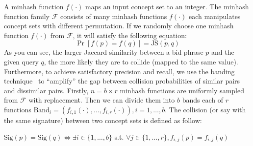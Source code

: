 A minhash function $f(\cdot)$ maps an input concept set to an integer.  The minhash function family
$\mathcal{F}$ consists of many minhash functions
$f(\cdot)$ each manipulates concept sets with different permutation. 
If we randomly choose one minhash function $f(\cdot)$ from
$\mathcal{F}$, it will satisfy the following equation:
\begin{equation}
\label{eqn:minhash}
\Pr[f(p)=f(q)]=\text{JS}(p,q)
\end{equation}
As you can see, the larger Jaccard similarity between a bid phrase $p$ and the
given query $q$, the more likely they are to collide (mapped to the same value).
Furthermore, to achieve satisfactory precision and recall, we use the banding
technique~\cite{raja:massivedatasets} to ``amplify'' the gap between 
collision probabilities of similar pairs and dissimilar pairs.
Firstly, $n=b\times{}r$ minhash functions are uniformly sampled from $\mathcal{F}$ with
replacement. 
Then we can divide them into $b$ bands each of $r$ functions 
$\text{Band}_{i}=(f_{i,1}(\cdot),\ldots,f_{i,r}(\cdot)),i=1,\ldots,b$.
The collision (or say with the same signature) 
between two concept sets is defined as follow:
\begin{definition}
\label{def:col}
$\text{Sig}(p)=\text{Sig}(q)\Leftrightarrow{}\exists{}i\in\{1,\ldots,b\}$ s.t.
$\forall{}j\in\{1,\ldots,r\},f_{i,j}(p)=f_{i,j}(q)$
\end{definition}

